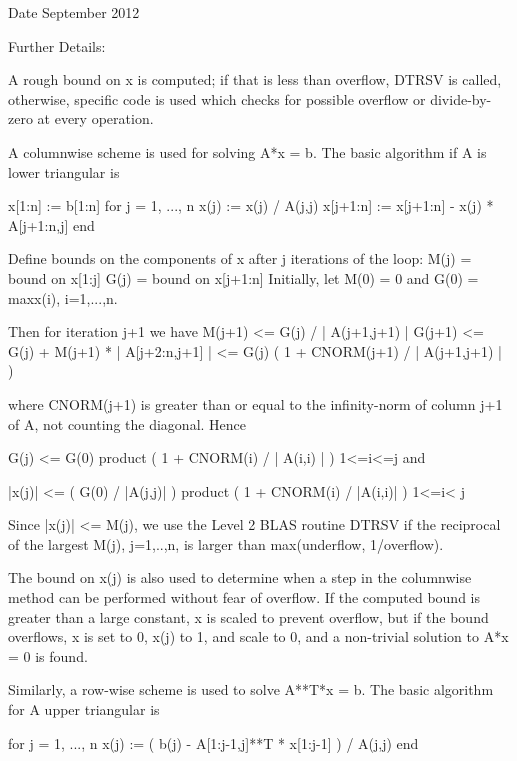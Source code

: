 \begin{DoxyDate}{Date}
September 2012 
\end{DoxyDate}
\begin{DoxyParagraph}{Further Details\+: }
\begin{DoxyVerb}  A rough bound on x is computed; if that is less than overflow, DTRSV
  is called, otherwise, specific code is used which checks for possible
  overflow or divide-by-zero at every operation.

  A columnwise scheme is used for solving A*x = b.  The basic algorithm
  if A is lower triangular is

       x[1:n] := b[1:n]
       for j = 1, ..., n
            x(j) := x(j) / A(j,j)
            x[j+1:n] := x[j+1:n] - x(j) * A[j+1:n,j]
       end

  Define bounds on the components of x after j iterations of the loop:
     M(j) = bound on x[1:j]
     G(j) = bound on x[j+1:n]
  Initially, let M(0) = 0 and G(0) = max{x(i), i=1,...,n}.

  Then for iteration j+1 we have
     M(j+1) <= G(j) / | A(j+1,j+1) |
     G(j+1) <= G(j) + M(j+1) * | A[j+2:n,j+1] |
            <= G(j) ( 1 + CNORM(j+1) / | A(j+1,j+1) | )

  where CNORM(j+1) is greater than or equal to the infinity-norm of
  column j+1 of A, not counting the diagonal.  Hence

     G(j) <= G(0) product ( 1 + CNORM(i) / | A(i,i) | )
                  1<=i<=j
  and

     |x(j)| <= ( G(0) / |A(j,j)| ) product ( 1 + CNORM(i) / |A(i,i)| )
                                   1<=i< j

  Since |x(j)| <= M(j), we use the Level 2 BLAS routine DTRSV if the
  reciprocal of the largest M(j), j=1,..,n, is larger than
  max(underflow, 1/overflow).

  The bound on x(j) is also used to determine when a step in the
  columnwise method can be performed without fear of overflow.  If
  the computed bound is greater than a large constant, x is scaled to
  prevent overflow, but if the bound overflows, x is set to 0, x(j) to
  1, and scale to 0, and a non-trivial solution to A*x = 0 is found.

  Similarly, a row-wise scheme is used to solve A**T*x = b.  The basic
  algorithm for A upper triangular is

       for j = 1, ..., n
            x(j) := ( b(j) - A[1:j-1,j]**T * x[1:j-1] ) / A(j,j)
       end


\end{DoxyVerb}
\end{DoxyParagraph}
